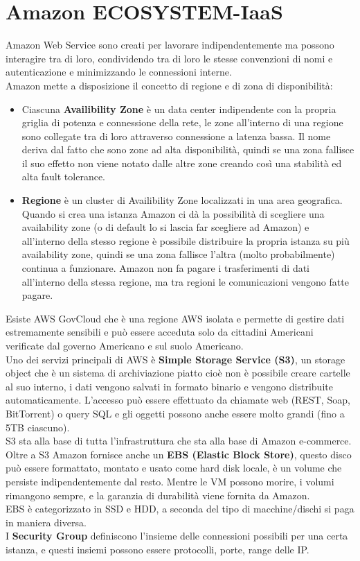 \documentclass[11pt, twocolumn]{article}
\begin{document}
\section{Amazon ECOSYSTEM-IaaS}
Amazon Web Service sono creati per lavorare indipendentemente ma possono interagire tra di loro, condividendo tra di loro le stesse convenzioni di nomi e autenticazione e minimizzando le connessioni interne.
\\
Amazon mette a disposizione il concetto di regione e di zona di disponibilità:
\begin{itemize}[noitemsep, topsep=0ex, wide]
	\item Ciascuna \textbf{Availibility Zone} è un data center indipendente con la propria griglia di potenza e connessione della rete, le zone all'interno di una regione sono collegate tra di loro attraverso connessione a latenza bassa. 
	Il nome deriva dal fatto che sono zone ad alta disponibilità, quindi se una zona fallisce il suo effetto non viene notato dalle altre zone creando così una stabilità ed alta fault tolerance.
	\item \textbf{Regione} è un cluster di Availibility Zone localizzati in una area geografica. 
	Quando si crea una istanza Amazon ci dà la possibilità di scegliere una availability zone (o di default lo si lascia far scegliere ad Amazon) e all'interno della stesso regione è possibile distribuire la propria istanza su più availability zone, quindi se una zona fallisce l'altra (molto probabilmente) continua a funzionare.
	Amazon non fa pagare i trasferimenti di dati all'interno della stessa regione, ma tra regioni le comunicazioni vengono fatte pagare.
\end{itemize}
Esiste AWS GovCloud che è una regione AWS isolata e permette di gestire dati estremamente sensibili e può essere acceduta solo da cittadini Americani verificate dal governo Americano e sul suolo Americano.\\
Uno dei servizi principali di AWS è \textbf{Simple Storage Service (S3)}, un storage object che è un sistema di archiviazione piatto cioè non è possibile creare cartelle al suo interno, i dati vengono salvati in formato binario e vengono distribuite automaticamente. 
L'accesso può essere effettuato da chiamate web (REST, Soap, BitTorrent) o query SQL e gli oggetti possono anche essere molto grandi (fino a 5TB ciascuno).\\
S3 sta alla base di tutta l'infrastruttura che sta alla base di Amazon e-commerce.
Oltre a S3 Amazon fornisce anche un \textbf{EBS (Elastic Block Store)}, questo disco può essere formattato, montato e usato come hard disk locale, è un volume che persiste indipendentemente dal resto.
Mentre le VM possono morire, i volumi rimangono sempre, e la garanzia di durabilità viene fornita da Amazon.\\
EBS è categorizzato in SSD e HDD, a seconda del tipo di macchine/dischi si paga in maniera diversa.\\
I \textbf{Security Group} definiscono l'insieme delle connessioni possibili per una certa istanza, e questi insiemi possono essere protocolli, porte, range delle IP.
\end{document}
